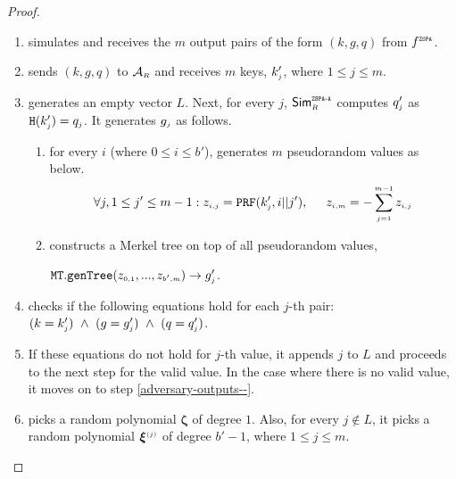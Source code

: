 \begin{proof}
\begin{enumerate}
%
\item simulates  \zspa and receives the $m$ output pairs of the form $( k,  g,  q) $ from $f^{\scriptscriptstyle \mathtt{ZSPA}}$.
%
\item sends $( k,  g,  q) $ to $\mathcal{A}_{\scriptscriptstyle R}$ and receives $m$ keys, $ k'_{\scriptscriptstyle j}$, where $1\leq j \leq m$. 
%
\item\label{ZSPA-A-Case-2-generate-z} generates an empty vector $ L$. Next, for every $j$, $\mathsf{Sim}^{\scriptscriptstyle \mathtt{ZSPA\text{-}A}}_{\scriptscriptstyle R}$ computes $q'_{\scriptscriptstyle j}$ as $\mathtt {H}( k'_{\scriptscriptstyle j})=q_{\scriptscriptstyle j}$.  It generates $g_{\scriptscriptstyle j}$ as follows. 


\begin{enumerate}

\item\label{gen-pr-vals} for every $i$ (where $0\leq i \leq b'$), generates $m$ pseudorandom values as below. 
%
 $$\forall j, 1\leq j' \leq m-1: z_{\scriptscriptstyle i,j}=\mathtt{PRF}( k'_{\scriptscriptstyle j},i||j'), \hspace{5mm} z_{\scriptscriptstyle i,m}=-\sum\limits^{\scriptscriptstyle m-1}_{\scriptscriptstyle j=1}z_{\scriptscriptstyle i,j}$$
%
\item   constructs a Merkel tree on top of all pseudorandom values,  

$\mathtt{MT.genTree}(z_{\scriptscriptstyle 0,1},...,z_{\scriptscriptstyle b', m})\rightarrow  g'_{\scriptscriptstyle j}$. 
%
\end{enumerate}
%
\item checks if the following equations hold for each $j$-th pair: 
%
$( k=    k'_{\scriptscriptstyle j}) \ \wedge\  ( g=   g'_{\scriptscriptstyle j})  \ \wedge\ ( q=  q'_{\scriptscriptstyle j})$.
%
%
\item If these equations do not hold for $j$-th value, it appends $j$ to $ L$ and proceeds to the next step for the valid value. In the case where there is no valid value, it moves on to step \ref{adversary-outputs--}. 


\item picks a random polynomial ${\bm \zeta}$ of degree $1$. Also, for every $j\notin  L$, it picks a random polynomial ${\bm\xi}^{\scriptscriptstyle (j)}$ of degree $b'-1$, where $1\leq j \leq m$. 
%


\end{enumerate}
\end{proof}
